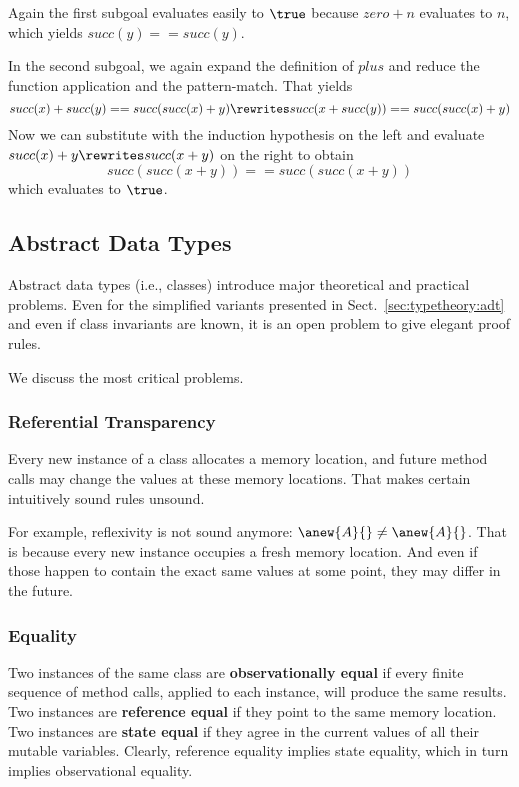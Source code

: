 \begin{example}
Again the first subgoal evaluates easily to $\true$ because $zero+n$ evaluates to $n$, which yields $succ(y)==succ(y)$.

In the second subgoal, we again expand the definition of $plus$ and reduce the function application and the pattern-match.
That yields
\[succ(x)+succ(y)==succ(succ(x)+y) \rewrites succ(x+succ(y))==succ(succ(x)+y)\]
Now we can substitute with the induction hypothesis on the left and evaluate $succ(x)+y\rewrites succ(x+y)$ on the right to obtain
\[succ(succ(x+y))==succ(succ(x+y))\]
which evaluates to $\true$.
\end{example}

\subsection{Abstract Data Types}

Abstract data types (i.e., classes) introduce major theoretical and practical problems.
Even for the simplified variants presented in Sect.~\ref{sec:typetheory:adt} and even if class invariants are known, it is an open problem to give elegant proof rules.

We discuss the most critical problems.

\subsubsection{Referential Transparency}

Every new instance of a class allocates a memory location, and future method calls may change the values at these memory locations.
That makes certain intuitively sound rules unsound.

For example, reflexivity is not sound anymore: $\anew{A}{}\neq \anew{A}{}$.
That is because every new instance occupies a fresh memory location.
And even if those happen to contain the exact same values at some point, they may differ in the future.

\subsubsection{Equality}

Two instances of the same class are \textbf{observationally equal} if every finite sequence of method calls, applied to each instance, will produce the same results.
Two instances are \textbf{reference equal} if they point to the same memory location.
Two instances are \textbf{state equal} if they agree in the current values of all their mutable variables.
Clearly, reference equality implies state equality, which in turn implies observational equality.

